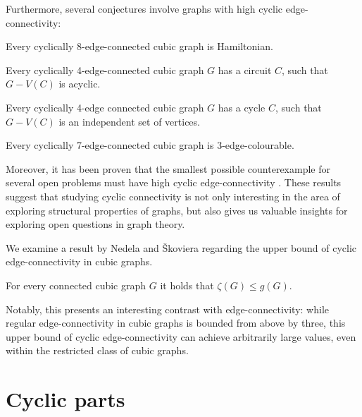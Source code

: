 \documentclass[12pt, twoside]{book}
\begin{document}
Furthermore, several conjectures involve graphs with high cyclic edge-connectivity:

\begin{conjecture}
	Every cyclically $8$-edge-connected cubic graph is Hamiltonian.
\end{conjecture}

\begin{conjecture}
	Every cyclically 4-edge-connected cubic graph $G$ has a circuit $C$, such that $G-V (C)$ is acyclic.
\end{conjecture}

\begin{conjecture}
	Every cyclically 4-edge connected cubic graph $G$ has a cycle $C$, such that $G-V(C)$ is an independent set of vertices.
\end{conjecture}

\begin{conjecture}
	Every cyclically 7-edge-connected cubic graph is 3-edge-colourable.
\end{conjecture}

Moreover, it has been proven that the smallest possible counterexample for several open problems must have high cyclic edge-connectivity \cite{Kochol2004, Macajova2020}. These results suggest that studying cyclic connectivity is not only interesting in the area of exploring structural properties of graphs, but also gives us valuable insights for exploring open questions in graph theory.

We examine a result by Nedela and Škoviera regarding the upper bound of cyclic edge-connectivity in cubic graphs. 

\begin{proposition}\label{prop:cyclic-con-less-than-girth}
	For every connected cubic graph $G$ it holds that $\zeta(G)\leq g(G)$.
\end{proposition}

Notably, this presents an interesting contrast with edge-connectivity: while regular edge-connectivity in cubic graphs is bounded from above by three, this upper bound of cyclic edge-connectivity can achieve arbitrarily large values, even within the restricted class of cubic graphs.

\section{Cyclic parts}\label{sec:cyclic-parts}
\end{document}
